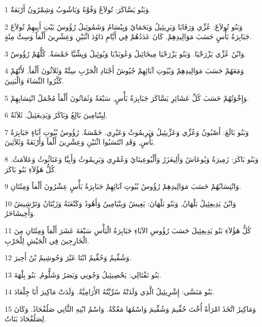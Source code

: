 \par 1 وَبَنُو يَسَّاكَرَ: تُولاَعُ وَفُوَّةُ وَيَاشُوبُ وَشِمْرُونُ أَرْبَعَةٌ.
\par 2 وَبَنُو تُولاَعَ: عُزِّي وَرَفَايَا وَيَرِيئِيلُ وَيَحَمَايُ وَيِبْسَامُ وَشَمُوئِيلُ رُؤُوسُ بَيْتِ أَبِيهِمْ تُولاَعَ جَبَابِرَةُ بَأْسٍ حَسَبَ مَوَالِيدِهِمْ. كَانَ عَدَدُهُمْ فِي أَيَّامِ دَاوُدَ اثْنَيْنِ وَعِشْرِينَ أَلْفاً وَسِتَّ مِئَةٍ.
\par 3 وَابْنُ عُزِّي يَزْرَحْيَا. وَبَنُو يَزْرَحْيَا مِيخَائِيلُ وَعُوبَدْيَا وَيُوئِيلُ وَيِشِّيَّا خَمْسَةٌ. كُلُّهُمْ رُؤُوسٌ.
\par 4 وَمَعَهُمْ حَسَبَ مَوَالِيدِهِمْ وَبُيُوتِ آبَائِهِمْ جُيُوشُ أَجْنَادِ الْحَرْبِ سِتَّةٌ وَثَلاَثُونَ أَلْفاً, لأَنَّهُمْ كَثَّرُوا النِّسَاءَ وَالْبَنِينَ.
\par 5 وَإِخْوَتُهُمْ حَسَبَ كُلِّ عَشَائِرِ يَسَّاكَرَ جَبَابِرَةُ بَأْسٍ, سَبْعَةٌ وَثَمَانُونَ أَلْفاً مُجْمَلُ انْتِسَابِهِمْ.
\par 6 لِبِنْيَامِينَ بَالِعُ وَبَاكَرُ وَيَدِيعَئِيلُ. ثَلاَثَةٌ.
\par 7 وَبَنُو بَالَعَ: أَصْبُونُ وَعُزِّي وَعَزِّيئِيلُ وَيَرِيمُوثُ وَعَيْرِي. خَمْسَةٌ. رُؤُوسُ بُيُوتِ آبَاءٍ جَبَابِرَةُ بَأْسٍ, وَقَدِ انْتَسَبُوا اثْنَيْنِ وَعِشْرِينَ أَلْفاً وَأَرْبَعَةً وَثَلاَثِينَ.
\par 8 وَبَنُو بَاكَرَ: زَمِيرَةُ وَيُوعَاشُ وَأَلِيعَزَرُ وَأَلْيُوعِينَايُ وَعُمْرِي وَيَرِيمُوثُ وَأَبِيَّا وَعَنَاثُوثُ وَعَلاَمَثُ. كُلُّ هَؤُلاَءِ بَنُو بَاكَرَ.
\par 9 وَانْتِسَابُهُمْ حَسَبَ مَوَالِيدِهِمْ رُؤُوسُ بُيُوتِ آبَائِهِمْ جَبَابِرَةُ بَأْسٍ عِشْرُونَ أَلْفاً وَمِئَتَانِ.
\par 10 وَابْنُ يَدِيعِئِيلُ بَلْهَانُ, وَبَنُو بَلْهَانَ: يَعِيشُ وَبِنْيَامِينُ وَأَهُودُ وَكَنْعَنَةُ وَزَيْتَانُ وَتَرْشِيشُ وَأَخِيشَاحَرُ.
\par 11 كُلُّ هَؤُلاَءِ بَنُو يَدِيعِئِيلَ حَسَبَ رُؤُوسِ الآبَاءِ جَبَابِرَةُ الْبَأْسِ سَبْعَةَ عَشَرَ أَلْفاً وَمِئَتَانِ مِنَ الْخَارِجِينَ فِي الْجَيْشِ لِلْحَرْبِ.
\par 12 وَشُفِّيمُ وَحُفِّيمُ ابْنَا عَيْرَ وَحُوشِيمُ بْنُ أَحِيرَ.
\par 13 بَنُو نَفْتَالِي: يَحْصِيئِيلُ وَجُونِي وَيَصَرُ وَشَلُّومُ, بَنُو بِلْهَةَ.
\par 14 بَنُو مَنَسَّى: إِشْرِيئِيلُ الَّذِي وَلَدَتْهُ سُرِّيَّتُهُ الأَرَامِيَّةُ. وَلَدَتْ مَاكِيرَ أَبَا جِلْعَادَ.
\par 15 وَمَاكِيرُ اتَّخَذَ امْرَأَةً أُخْتَ حُفِّيمَ وَشُفِّيمَ وَاسْمُهَا مَعْكَةُ. وَاسْمُ ابْنِهِ الثَّانِي صَلُفْحَادُ. وَكَانَ لِصَلُفْحَادَ بَنَاتٌ.
